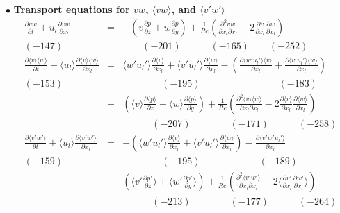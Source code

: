 \documentclass[a4paper,11pt]{article}
\begin{document}
\noindent $\bullet$  \textbf{Transport equations for $vw$, $\langle vw\rangle$, and $\langle v'w'\rangle$}
\begin{eqnarray}
\frac{\partial vw }{\partial t}
+u_l\frac{\partial vw }{\partial x_l}
&=&-(v\frac{\partial p }{\partial z}+w\frac{\partial p }{\partial y})
+\frac{1}{Re}(\frac{\partial^2 vw }{\partial x_l\partial x_l}-2\frac{\partial v }{\partial x_l}\frac{\partial w }{\partial x_l}) \\
(-147) &&\quad{}  \quad{}(-201) \quad{}  \qquad{} (-165) \quad{} \quad{} (-252)\nonumber \\
\frac{\partial \langle v\rangle \langle w\rangle }{\partial t}
+\langle u_l\rangle \frac{\partial \langle v\rangle \langle w\rangle }{\partial x_l}
&=&\langle w'u_l'\rangle \frac{\partial \langle v \rangle}{\partial x_l}+\langle v'u_l'\rangle \frac{\partial \langle w \rangle  }{\partial x_l}
-(\frac{\partial \langle w'u_l'\rangle \langle v \rangle }{\partial x_l}+\frac{\partial \langle v'u_l'\rangle \langle w \rangle }{\partial x_l}) \nonumber \\
(-153) \quad{}&&\qquad{} \qquad{}(-195) \qquad{}\qquad{}  \qquad{} \qquad{} (-183)\nonumber \\
&-&(\langle v\rangle \frac{\partial \langle p\rangle }{\partial z}+\langle w \rangle \frac{\partial \langle p\rangle }{\partial y})
+\frac{1}{Re}(\frac{\partial^2 \langle v\rangle \langle w \rangle}{\partial x_l\partial x_l}-2\frac{\partial \langle v\rangle }{\partial x_l} \frac{\partial \langle w\rangle }{\partial x_l}) \\
&&\qquad{}\quad{} (-207) \qquad{} \qquad{}  (-171)\quad{} \qquad{} (-258)\nonumber \\
\frac{\partial \langle v'w'\rangle }{\partial t}
+\langle u_l\rangle \frac{\partial \langle v'w'\rangle }{\partial x_l}
&=&-(\langle w'u_l'\rangle \frac{\partial \langle v \rangle  }{\partial x_l}+\langle v'u_l'\rangle \frac{\partial \langle w \rangle  }{\partial x_l})
-\frac{\partial \langle v'w'u_l'\rangle}{\partial x_l} \nonumber \\
(-159) \quad{}&&\qquad{} \qquad{}(-195)  \qquad{}\qquad{} \qquad{} (-189)\nonumber \\
&-&(\langle v' \frac{\partial  p' }{\partial z}\rangle +\langle w' \frac{\partial p' }{\partial y}\rangle)
+\frac{1}{Re}(\frac{\partial^2 \langle v'w' \rangle}{\partial x_l\partial x_l}-2\langle \frac{\partial  v' }{\partial x_l}\frac{\partial  w' }{\partial x_l}\rangle) \\
&&\qquad{}\quad{} (-213) \qquad{} \qquad{}  (-177)\quad{} \qquad{} (-264)\nonumber 
\end{eqnarray}
\end{document}
